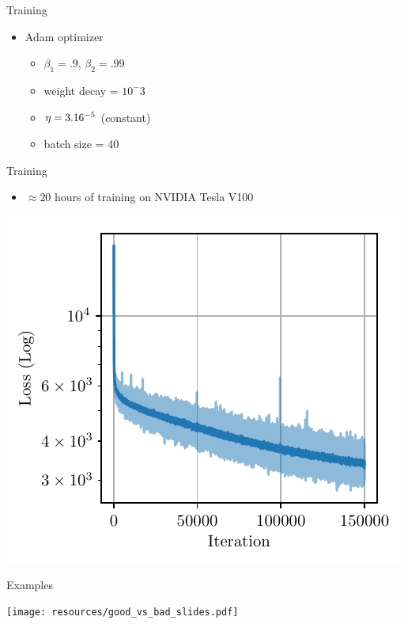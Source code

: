 \documentclass{beamer}
\begin{document}
\begin{frame}{Training}
  \begin{itemize}
    \item Adam optimizer
       \begin{itemize}
         \item $\beta_1 = .9$, $\beta_2 = .99$
         \item weight decay = $10^-3$
         \item $\eta = 3.16 \time 10^{-5}$ (constant)
         \item batch size = 40
       \end{itemize}
  \end{itemize}
\end{frame}

\begin{frame}{Training}
  \begin{itemize}
    \item $\approx 20$ hours of training on NVIDIA Tesla V100
  \end{itemize}

  \begin{center}
    \includegraphics[width=.6\textwidth]{resources/learning_curve.pdf}
  \end{center}
\end{frame}

\begin{frame}{Examples}
  \begin{center}
    \texttt{[image: resources/good\_vs\_bad\_slides.pdf]}
  \end{center}
\end{frame}
\end{document}
